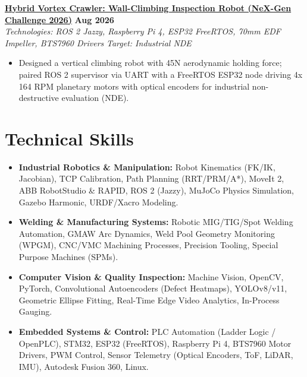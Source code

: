 \documentclass[letterpaper,10pt]{article}
\begin{document}
\noindent
\href{https://github.com/Arkz-Deepak/vortex-crawler}{\textbf{Hybrid Vortex Crawler: Wall-Climbing Inspection Robot (NeX-Gen Challenge 2026)}} \hfill \textbf{Aug 2026} \\
\textit{Technologies: ROS 2 Jazzy, Raspberry Pi 4, ESP32 FreeRTOS, 70mm EDF Impeller, BTS7960 Drivers} \hfill \textit{Target: Industrial NDE} \\
\begin{itemize}
    \item Designed a vertical climbing robot with 45N aerodynamic holding force; paired ROS 2 supervisor via UART with a FreeRTOS ESP32 node driving 4x 164 RPM planetary motors with optical encoders for industrial non-destructive evaluation (NDE).
\end{itemize}

\section{Technical Skills}
\begin{itemize}
    \item \textbf{Industrial Robotics \& Manipulation:} Robot Kinematics (FK/IK, Jacobian), TCP Calibration, Path Planning (RRT/PRM/A*), MoveIt 2, ABB RobotStudio \& RAPID, ROS 2 (Jazzy), MuJoCo Physics Simulation, Gazebo Harmonic, URDF/Xacro Modeling.
    \item \textbf{Welding \& Manufacturing Systems:} Robotic MIG/TIG/Spot Welding Automation, GMAW Arc Dynamics, Weld Pool Geometry Monitoring (WPGM), CNC/VMC Machining Processes, Precision Tooling, Special Purpose Machines (SPMs).
    \item \textbf{Computer Vision \& Quality Inspection:} Machine Vision, OpenCV, PyTorch, Convolutional Autoencoders (Defect Heatmaps), YOLOv8/v11, Geometric Ellipse Fitting, Real-Time Edge Video Analytics, In-Process Gauging.
    \item \textbf{Embedded Systems \& Control:} PLC Automation (Ladder Logic / OpenPLC), STM32, ESP32 (FreeRTOS), Raspberry Pi 4, BTS7960 Motor Drivers, PWM Control, Sensor Telemetry (Optical Encoders, ToF, LiDAR, IMU), Autodesk Fusion 360, Linux.
\end{itemize}
\end{document}
